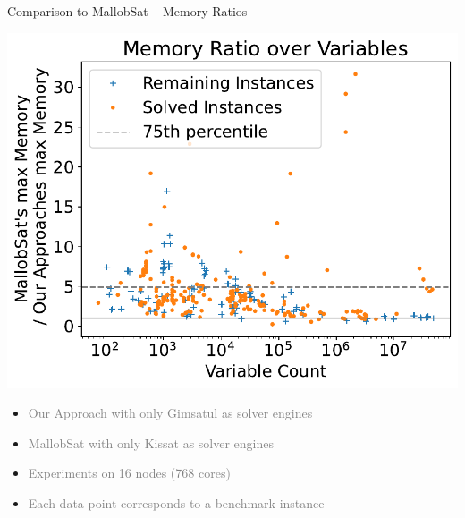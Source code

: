 \documentclass[]{sdqbeamer}
\begin{document}
\begin{frame}{Comparison to MallobSat -- Memory Ratios}
    \begin{minipage}{.45\textwidth}
        \center
        \includegraphics[scale=.8]{plots/16node_compare/mem_ratio_over_vars.pdf}\\
    \end{minipage}
    \hfill
    \begin{minipage}{.45\textwidth}
        \begin{itemize}
            \item \textcolor{gray}{Our Approach with only Gimsatul as solver engines}
            \item \textcolor{gray}{MallobSat with only Kissat as solver engines}
            \item \textcolor{gray}{Experiments on 16 nodes (768 cores)}
            \item \textcolor{gray}{Each data point corresponds to a benchmark instance}
        \end{itemize}
    \end{minipage}
\end{frame}
\end{document}
